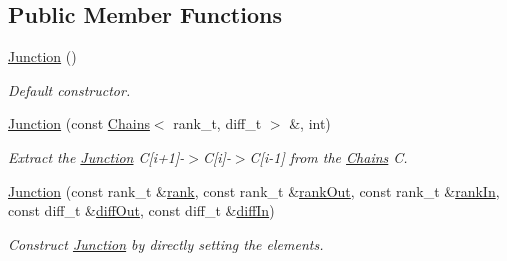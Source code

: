 \subsection*{Public Member Functions}
\begin{DoxyCompactItemize}
\item 
\hyperlink{classMackey_1_1Junction_a943b60d8e77594e4b19da7a5e40cb62e}{Junction} ()
\begin{DoxyCompactList}\small\item\em Default constructor. \end{DoxyCompactList}\item 
\hyperlink{classMackey_1_1Junction_ae6e36887e5bd3be8fe6175a501c749db}{Junction} (const \hyperlink{classMackey_1_1Chains}{Chains}$<$ rank\+\_\+t, diff\+\_\+t $>$ \&, int)
\begin{DoxyCompactList}\small\item\em Extract the \hyperlink{classMackey_1_1Junction}{Junction} C\mbox{[}i+1\mbox{]}-\/$>$C\mbox{[}i\mbox{]}-\/$>$C\mbox{[}i-\/1\mbox{]} from the \hyperlink{classMackey_1_1Chains}{Chains} C. \end{DoxyCompactList}\item 
\hyperlink{classMackey_1_1Junction_a62c85d26100ca5e561b3c9edf32b473f}{Junction} (const rank\+\_\+t \&\hyperlink{classMackey_1_1Junction_a70d63a0f6ad20b052210ab0009815a9e}{rank}, const rank\+\_\+t \&\hyperlink{classMackey_1_1Junction_afe400bc60b84966b933fd57c11400607}{rank\+Out}, const rank\+\_\+t \&\hyperlink{classMackey_1_1Junction_a6174a3bef929f4b5b892d3b7ccb20528}{rank\+In}, const diff\+\_\+t \&\hyperlink{classMackey_1_1Junction_a909fce095bc4647a312d6b10480b2d9a}{diff\+Out}, const diff\+\_\+t \&\hyperlink{classMackey_1_1Junction_a581e0d7b62b7bf380d68936a79828cfc}{diff\+In})
\begin{DoxyCompactList}\small\item\em Construct \hyperlink{classMackey_1_1Junction}{Junction} by directly setting the elements. \end{DoxyCompactList}\end{DoxyCompactItemize}
